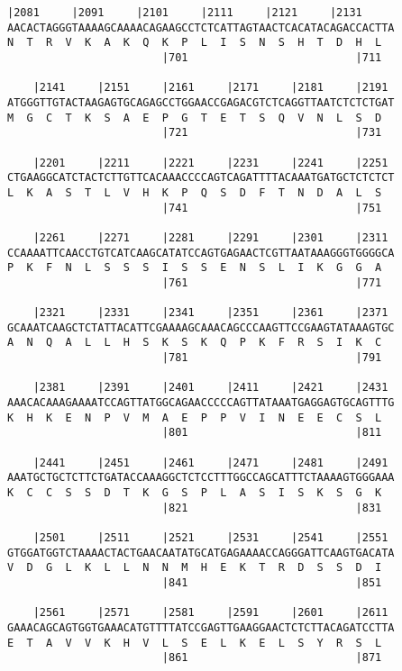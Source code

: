 \documentclass{article}
\begin{document}
\newpage
\begin{Verbatim}[fontfamily=courier]
    |2081     |2091     |2101     |2111     |2121     |2131 
AACACTAGGGTAAAAGCAAAACAGAAGCCTCTCATTAGTAACTCACATACAGACCACTTA
N  T  R  V  K  A  K  Q  K  P  L  I  S  N  S  H  T  D  H  L  
                        |701                          |711  

    |2141     |2151     |2161     |2171     |2181     |2191 
ATGGGTTGTACTAAGAGTGCAGAGCCTGGAACCGAGACGTCTCAGGTTAATCTCTCTGAT
M  G  C  T  K  S  A  E  P  G  T  E  T  S  Q  V  N  L  S  D  
                        |721                          |731  

    |2201     |2211     |2221     |2231     |2241     |2251 
CTGAAGGCATCTACTCTTGTTCACAAACCCCAGTCAGATTTTACAAATGATGCTCTCTCT
L  K  A  S  T  L  V  H  K  P  Q  S  D  F  T  N  D  A  L  S  
                        |741                          |751  

    |2261     |2271     |2281     |2291     |2301     |2311 
CCAAAATTCAACCTGTCATCAAGCATATCCAGTGAGAACTCGTTAATAAAGGGTGGGGCA
P  K  F  N  L  S  S  S  I  S  S  E  N  S  L  I  K  G  G  A  
                        |761                          |771  

    |2321     |2331     |2341     |2351     |2361     |2371 
GCAAATCAAGCTCTATTACATTCGAAAAGCAAACAGCCCAAGTTCCGAAGTATAAAGTGC
A  N  Q  A  L  L  H  S  K  S  K  Q  P  K  F  R  S  I  K  C  
                        |781                          |791  

    |2381     |2391     |2401     |2411     |2421     |2431 
AAACACAAAGAAAATCCAGTTATGGCAGAACCCCCAGTTATAAATGAGGAGTGCAGTTTG
K  H  K  E  N  P  V  M  A  E  P  P  V  I  N  E  E  C  S  L  
                        |801                          |811  

    |2441     |2451     |2461     |2471     |2481     |2491 
AAATGCTGCTCTTCTGATACCAAAGGCTCTCCTTTGGCCAGCATTTCTAAAAGTGGGAAA
K  C  C  S  S  D  T  K  G  S  P  L  A  S  I  S  K  S  G  K  
                        |821                          |831  

    |2501     |2511     |2521     |2531     |2541     |2551 
GTGGATGGTCTAAAACTACTGAACAATATGCATGAGAAAACCAGGGATTCAAGTGACATA
V  D  G  L  K  L  L  N  N  M  H  E  K  T  R  D  S  S  D  I  
                        |841                          |851  

    |2561     |2571     |2581     |2591     |2601     |2611 
GAAACAGCAGTGGTGAAACATGTTTTATCCGAGTTGAAGGAACTCTCTTACAGATCCTTA
E  T  A  V  V  K  H  V  L  S  E  L  K  E  L  S  Y  R  S  L  
                        |861                          |871  

\end{Verbatim}
\end{document}

